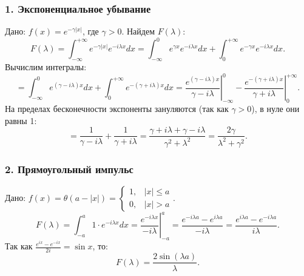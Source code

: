\documentclass[12pt,a4paper,openany]{book}
\begin{document}
\subsubsection{1. Экспоненциальное убывание}
Дано: $f(x) = e^{-\gamma|x|}$, где $\gamma > 0$.
Найдем $F(\lambda)$:
$$
F(\lambda) = \int_{-\infty}^{+\infty} e^{-\gamma|x|} e^{-i\lambda x} dx = \int_{-\infty}^{0} e^{\gamma x} e^{-i\lambda x} dx + \int_{0}^{+\infty} e^{-\gamma x} e^{-i\lambda x} dx.
$$
Вычислим интегралы:
$$
= \int_{-\infty}^{0} e^{(\gamma - i\lambda)x} dx + \int_{0}^{+\infty} e^{-(\gamma + i\lambda)x} dx =
\left. \frac{e^{(\gamma - i\lambda)x}}{\gamma - i\lambda} \right|_{-\infty}^0 - \left. \frac{e^{-(\gamma + i\lambda)x}}{\gamma + i\lambda} \right|_0^{+\infty}.
$$
На пределах бесконечности экспоненты зануляются (так как $\gamma > 0$), в нуле они равны 1:
$$
= \frac{1}{\gamma - i\lambda} + \frac{1}{\gamma + i\lambda} = \frac{\gamma + i\lambda + \gamma - i\lambda}{\gamma^2 + \lambda^2} = \frac{2\gamma}{\lambda^2 + \gamma^2}.
$$

\begin{center}
\quad
{}
\end{center}

\subsubsection{2. Прямоугольный импульс}
Дано: $f(x) = \theta(a - |x|) = \begin{cases} 1, & |x| \le a \\ 0, & |x| > a \end{cases}$.
$$
F(\lambda) = \int_{-a}^{a} 1 \cdot e^{-i\lambda x} dx = \left. \frac{e^{-i\lambda x}}{-i\lambda} \right|_{-a}^{a} = \frac{e^{-i\lambda a} - e^{i\lambda a}}{-i\lambda} = \frac{e^{i\lambda a} - e^{-i\lambda a}}{i\lambda}.
$$
Так как $\frac{e^{ix} - e^{-ix}}{2i} = \sin x$, то:
$$
F(\lambda) = \frac{2\sin(\lambda a)}{\lambda}.
$$
\end{document}
